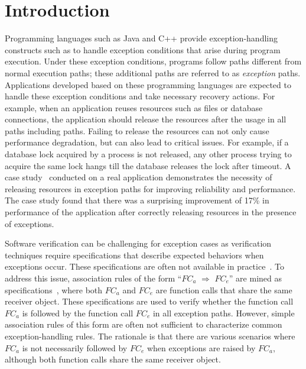 \section{Introduction}
\label{sec:intro}
\vspace*{-3ex}

Programming languages such as Java and C++ provide exception-handling 
constructs such as  to handle exception conditions that arise
during program execution. Under these exception conditions, programs follow paths
different from normal execution paths; these additional paths are referred to as 
\emph{exception} paths. Applications developed based on these programming
languages are expected to handle these exception conditions and take necessary recovery
actions. For example, when an application reuses resources such as files or database connections,
the application should release the resources after the usage in all paths
including  paths. Failing to release the resources can not only cause performance degradation, 
but can also lead to critical issues. For example, if a database lock acquired by a
process is not released, any other process trying to acquire the same lock
hangs till the database releases the lock after timeout.
A case study~\cite{Weimer04} conducted on a real application 
demonstrates the necessity of releasing resources in exception paths 
for improving reliability and performance. 
The case study found that there was a surprising
improvement of 17\% in performance of the application after 
correctly releasing resources in the presence of exceptions.


Software verification can be challenging for exception cases as verification
techniques require specifications that describe expected behaviors when exceptions occur.
These specifications are often not available in practice~\cite{document:leth}.
To address this issue, association rules of the form ``$FC_a$ $\Rightarrow$ $FC_e$''
are mined as specifications~\cite{WeimerN05}, where both $FC_a$ and $FC_e$ are function calls that share
the same receiver object. These specifications are used to 
verify whether the function call $FC_a$ is followed by the function call $FC_e$ in all 
exception paths. However, simple association rules of this form are often not sufficient
to characterize common exception-handling rules. The rationale is that
there are various scenarios where $FC_a$ is not necessarily followed by $FC_e$ 
when exceptions are raised by $FC_a$, although both function calls 
share the same receiver object. 

